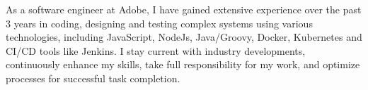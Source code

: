 

\begin{cvparagraph}

As a software engineer at Adobe, I have gained extensive experience over the past 3 years in coding, designing and testing complex systems using various technologies, including JavaScript, NodeJs, Java/Groovy, Docker, Kubernetes and CI/CD tools like Jenkins.
I stay current with industry developments, continuously enhance my skills, take full responsibility for my work, and optimize processes for successful task completion.

\end{cvparagraph}

\vspace{-3mm}